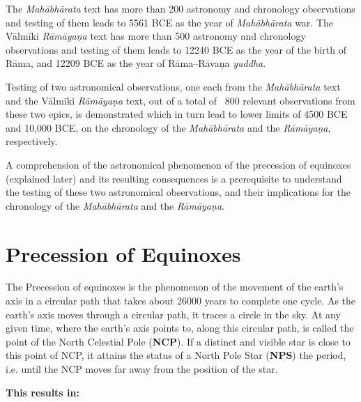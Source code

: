 The \textit{Mahābhārata} text has more than 200 astronomy and chronology observations and testing of them leads to 5561 BCE as the year of \textit{Mahābhārata} war. The Vālmīki \textit{Rāmāyaṇa} text has more than 500 astronomy and chronology observations and testing of them leads to 12240 BCE as the year of the birth of Rāma, and 12209 BCE as the year of Rāma–Rāvaṇa \textit{yuddha}.

Testing of two astronomical observations, one each from the \textit{Mahābhārata} text and the Vālmīki \textit{Rāmāyaṇa} text, out of a total of ~800 relevant observations from these two epics, is demonstrated which in turn lead to lower limits of 4500 BCE and 10,000 BCE, on the chronology of the \textit{Mahābhārata} and the \textit{Rāmāyaṇa}, respectively.

A comprehension of the astronomical phenomenon of the precession of equinoxes (explained later) and its resulting consequences is a prerequisite to understand the testing of these two astronomical observations, and their implications for the chronology of the \textit{Mahābhārata} and the \textit{Rāmāyaṇa}.


\section*{Precession of Equinoxes}

The Precession of equinoxes is the phenomenon of the movement of the earth’s axis in a circular path that takes about 26000 years to complete one cycle. As the earth’s axis moves through a circular path, it traces a circle in the sky. At any given time, where the earth’s axis points to, along this circular path, is called the point of the North Celestial Pole (\textbf{NCP}). If a distinct and visible star is close to this point of NCP, it attains the status of a North Pole Star (\textbf{NPS}) the period, i.e. until the NCP moves far away from the position of the star.

\textbf{This results in:}

